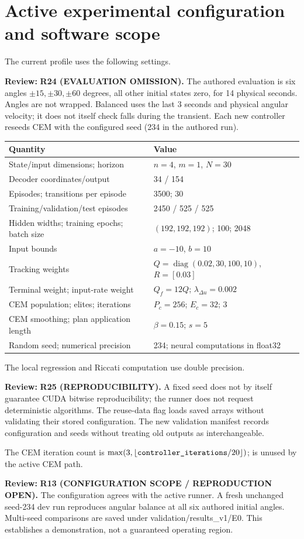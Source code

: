 \documentclass[11pt]{article}
\newcommand{\review}[1]{\par\noindent\textcolor{red!70!black}{\textbf{Review:} #1}\par}
\newcommand{\code}[1]{\texttt{\detokenize{#1}}}
\begin{document}
\section{Active experimental configuration and software scope}
The current \code{dev} profile uses the following settings.
\review{\textbf{R24 (EVALUATION OMISSION).} The authored evaluation is six angles $\pm15,\pm30,\pm60$ degrees, all other initial states zero, for 14 physical seconds. Angles are not wrapped. Balanced uses the last 3 seconds and physical angular velocity; it does not itself check falls during the transient. Each new controller reseeds CEM with the configured seed (234 in the authored run).}

\begin{center}
\small
\begin{tabular}{@{}ll@{}}
\toprule
Quantity & Value\\\midrule
State/input dimensions; horizon & $n=4$, $m=1$, $N=30$\\
Decoder coordinates/output & 34 / 154\\
Episodes; transitions per episode & 3500; 30\\
Training/validation/test episodes & 2450 / 525 / 525\\
Hidden widths; training epochs; batch size & $(192,192,192)$; 100; 2048\\
Input bounds & $a=-10$, $b=10$\\
Tracking weights & $Q=\operatorname{diag}(0.02,30,100,10)$, $R=[0.03]$\\
Terminal weight; input-rate weight & $Q_f=12Q$; $\lambda_{\Delta u}=0.002$\\
CEM population; elites; iterations & $P_c=256$; $E_c=32$; 3\\
CEM smoothing; plan application length & $\beta=0.15$; $s=5$\\
Random seed; numerical precision & 234; neural computations in float32\\\bottomrule
\end{tabular}
\end{center}
The local regression and Riccati computation use double precision.
\review{\textbf{R25 (REPRODUCIBILITY).} A fixed seed does not by itself guarantee CUDA bitwise reproducibility; the runner does not request deterministic algorithms. The reuse-data flag loads saved arrays without validating their stored configuration. The new validation manifest records configuration and seeds without treating old outputs as interchangeable.}
 The CEM iteration count is $\max(3,\lfloor\code{controller_iterations}/20\rfloor)$; \code{controller_lr} is unused by the active CEM path.
\review{\textbf{R13 (CONFIGURATION SCOPE / REPRODUCTION OPEN).} The configuration agrees with the active runner. A fresh unchanged seed-234 dev run reproduces angular balance at all six authored initial angles. Multi-seed comparisons are saved under validation/results_v1/E0. This establishes a demonstration, not a guaranteed operating region.}
\end{document}
